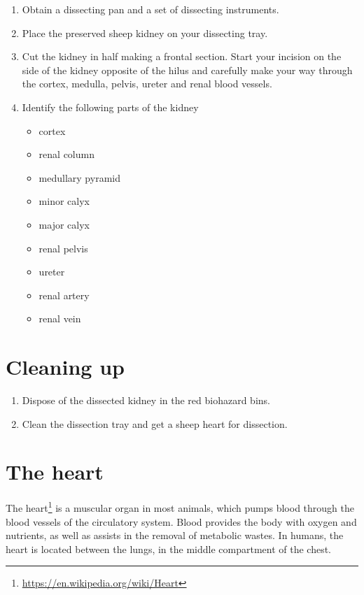 \documentclass[]{book}
\providecommand{\tightlist}{%
  \setlength{\itemsep}{0pt}\setlength{\parskip}{0pt}}
\let\rmarkdownfootnote\footnote%
\def\footnote{\protect\rmarkdownfootnote}
\renewcommand{\href}[2]{#2\footnote{\url{#1}}}
\begin{document}
\begin{enumerate}
\def\labelenumi{\arabic{enumi}.}
\tightlist
\item
  Obtain a dissecting pan and a set of dissecting instruments.
\item
  Place the preserved sheep kidney on your dissecting tray.
\item
  Cut the kidney in half making a frontal section. Start your incision on the side of the kidney opposite of the hilus and carefully make your way through the cortex, medulla, pelvis, ureter and renal blood vessels.
\item
  Identify the following parts of the kidney

  \begin{itemize}
  \tightlist
  \item
    cortex
  \item
    renal column
  \item
    medullary pyramid
  \item
    minor calyx
  \item
    major calyx
  \item
    renal pelvis
  \item
    ureter
  \item
    renal artery
  \item
    renal vein
  \end{itemize}
\end{enumerate}

\hypertarget{cleaning-up-4}{%
\section{Cleaning up}\label{cleaning-up-4}}

\begin{enumerate}
\def\labelenumi{\arabic{enumi}.}
\tightlist
\item
  Dispose of the dissected kidney in the red biohazard bins.
\item
  Clean the dissection tray and get a sheep heart for dissection.
\end{enumerate}

\hypertarget{the-heart}{%
\section{The heart}\label{the-heart}}

The \href{https://en.wikipedia.org/wiki/Heart}{heart} is a muscular organ in most animals, which pumps blood through the blood vessels of the circulatory system. Blood provides the body with oxygen and nutrients, as well as assists in the removal of metabolic wastes. In humans, the heart is located between the lungs, in the middle compartment of the chest.
\end{document}
